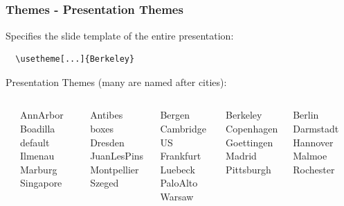 \documentclass[[newPxFont]{beamer}
\begin{document}
\subsection{}
\begin{frame}[fragile]
  \frametitle{Themes - Presentation Themes}
  Specifies the slide template of the entire presentation:
\begin{block}{}
\begin{verbatim}
  \usetheme[...]{Berkeley}
\end{verbatim}
\end{block}
\begin{block}{Presentation Themes (many are named after cities):}

\begin{footnotesize}
\begin{columns}
\begin{column}{.02\textwidth}
  \end{column}
  \begin{column}{.17\textwidth}
AnnArbor
Boadilla
default
Ilmenau
Marburg
Singapore
  \end{column}
  \begin{column}{.17\textwidth}
Antibes
boxes
Dresden
JuanLesPins
Montpellier
Szeged
\end{column}
\begin{column}{.17\textwidth}
Bergen\\
CambridgeUS
Frankfurt
Luebeck
PaloAlto
Warsaw
\end{column}
  \begin{column}{.17\textwidth}
Berkeley
Copenhagen
Goettingen
Madrid
Pittsburgh\\
~~~~
\end{column}
\begin{column}{.17\textwidth}
Berlin
Darmstadt
Hannover
Malmoe
Rochester\\
~~~~
\end{column}
\begin{column}{.01\textwidth}
\end{column}
\end{columns}
\end{footnotesize}
\end{block}
\end{frame}
\end{document}
